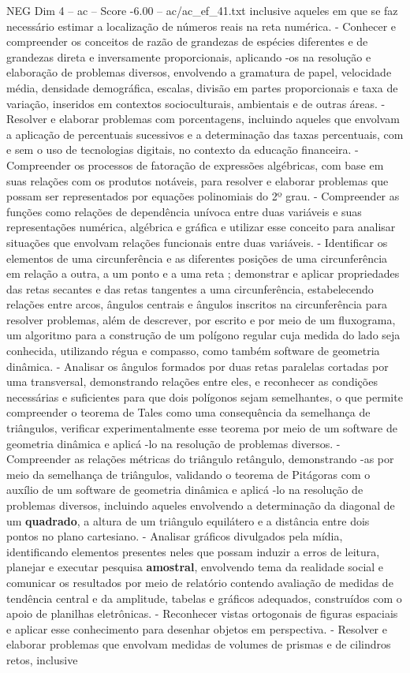 \begin{textsample}{NEG Dim 4 – ac – Score -6.00 – ac/ac\_ef\_41.txt}
inclusive aqueles em que se faz necessário estimar a localização de números reais na reta numérica. - Conhecer e compreender os conceitos de razão de grandezas de espécies diferentes e de grandezas direta e inversamente proporcionais, aplicando -os na resolução e elaboração de problemas diversos, envolvendo a gramatura de papel, velocidade média, densidade demográfica, escalas, divisão em partes proporcionais e taxa de variação, inseridos em contextos socioculturais, ambientais e de outras áreas. - Resolver e elaborar problemas com porcentagens, incluindo aqueles que envolvam a aplicação de percentuais sucessivos e a determinação das taxas percentuais, com e sem o uso de tecnologias digitais, no contexto da educação financeira. - Compreender os processos de fatoração de expressões algébricas, com base em suas relações com os produtos notáveis, para resolver e elaborar problemas que possam ser representados por equações polinomiais do 2º grau. - Compreender as funções como relações de dependência unívoca entre duas variáveis e suas representações numérica, algébrica e gráfica e utilizar esse conceito para analisar situações que envolvam relações funcionais entre duas variáveis. - Identificar os elementos de uma circunferência e as diferentes posições de uma circunferência em relação a outra, a um ponto e a uma reta ; demonstrar e aplicar propriedades das retas secantes e das retas tangentes a uma circunferência, estabelecendo relações entre arcos, ângulos centrais e ângulos inscritos na circunferência para resolver problemas, além de descrever, por escrito e por meio de um fluxograma, um algoritmo para a construção de um polígono regular cuja medida do lado seja conhecida, utilizando régua e compasso, como também software de geometria dinâmica. - Analisar os ângulos formados por duas retas paralelas cortadas por uma transversal, demonstrando relações entre eles, e reconhecer as condições necessárias e suficientes para que dois polígonos sejam semelhantes, o que permite compreender o teorema de Tales como uma consequência da semelhança de triângulos, verificar experimentalmente esse teorema por meio de um software de geometria dinâmica e aplicá -lo na resolução de problemas diversos. - Compreender as relações métricas do triângulo retângulo, demonstrando -as por meio da semelhança de triângulos, validando o teorema de Pitágoras com o auxílio de um software de geometria dinâmica e aplicá -lo na resolução de problemas diversos, incluindo aqueles envolvendo a determinação da diagonal de um \textbf{quadrado}, a altura de um triângulo equilátero e a distância entre dois pontos no plano cartesiano. - Analisar gráficos divulgados pela mídia, identificando elementos presentes neles que possam induzir a erros de leitura, planejar e executar pesquisa \textbf{amostral}, envolvendo tema da realidade social e comunicar os resultados por meio de relatório contendo avaliação de medidas de tendência central e da amplitude, tabelas e gráficos adequados, construídos com o apoio de planilhas eletrônicas. - Reconhecer vistas ortogonais de figuras espaciais e aplicar esse conhecimento para desenhar objetos em perspectiva. - Resolver e elaborar problemas que envolvam medidas de volumes de prismas e de cilindros retos, inclusive 
\end{textsample}
